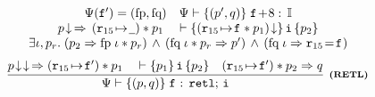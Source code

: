 \begin{figure*}[!thp]
{\begin{minipage}{1\linewidth}
\[{\begin{array}{c}
						\Psi (\lab{}') = (\specpre, \specpost) \quad
						\wfcblk{\astP'}{\astQ}{\lab{}\!+\!8}{\cblk} \\
						\nxtAst{\astP} \,\Rightarrow\,
                             (\regst{\reg{15}}{\notCare})
                                 * \astP_1
						\quad
						\wfins{\asrttm{(\regst{\reg{15}}{\lab{}} * \astP_1)}}
						{\simplins}{\astP_2}  \\
						\exists  \lgvl, \pr. \;
						\supimpl{\astP_2}{\astP'}{\specpre \; \lgvl * \pr}{\specpost \; \lgvl * \pr} \, \wedge \,
						(\specpost \; \lgvl \Rightarrow \reg{15} \!=\! \lab{})
					\end{array}	
				}
			\]
%
%
%
			\[
				\infer[\tinybftext{(RETL)}]
				{
					\wfcblk{\astP}{\astQ}{\lab{}}{\retl; \, \simplins}
				}
				{
                    \nxtAst{\nxtAst{\astP}} \,\Rightarrow
                      (\regst\RAreg{\lab{}'}) * \astP_1
                      \quad
                    \wfins{\astP_1}{\simplins}{\astP_2}
                    \quad
					(\regst\RAreg{\lab{}'}) * \astP_2 \Rightarrow \astQ
				}
			\]


\end{minipage}}
\end{figure*}
